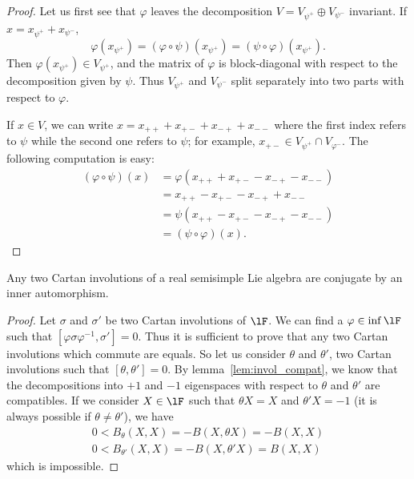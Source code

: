 \begin{proof}
	Let us first see that $\varphi$ leaves the decomposition $V=V_{\psi^+}\oplus V_{\psi^-}$ invariant. If $x=x_{\psi^+}+x_{\psi^-}$,
	\[
		\varphi(x_{\psi^+})=(\varphi\circ\psi)(x_{\psi^+})=(\psi\circ\varphi)(x_{\psi^+}).
	\]
	Then $\varphi(x_{\psi^+})\in V_{\psi^+}$, and the matrix of $\varphi$ is block-diagonal with respect to the decomposition given by $\psi$. Thus $V_{\psi^+}$ and $V_{\psi^-}$ split separately into two parts with respect to $\varphi$.

	If $x\in V$, we can write $x=x_{++}+x_{+-}+x_{-+}+x_{--}$ where the first index refers to $\psi$ while the second one refers to $\psi$; for example, $x_{+-}\in V_{\psi^+}\cap V_{\varphi^-}$. The following computation is easy:
	\begin{equation}
		\begin{split}
			(\varphi\circ\psi)(x)&=\varphi(x_{++}+x_{+-}-x_{-+}-x_{--})\\
			&=x_{++}-x_{+-}-x_{-+}+x_{--}\\
			&=\psi(x_{++}-x_{+-}-x_{-+}-x_{--})\\
			&=(\psi\circ\varphi)(x).
		\end{split}
	\end{equation}
\end{proof}

\begin{corollary}\label{cor:Cartan_conj_inner}
	Any two Cartan involutions of a real semisimple Lie algebra are conjugate by an inner automorphism. 
\end{corollary}

\begin{proof}
	Let $\sigma$ and $\sigma'$ be two Cartan involutions of $\lF$. We can find a $\varphi\in\inf\lF$ such that $[\varphi\sigma\varphi^{-1},\sigma']=0$. Thus it is sufficient to prove that any two Cartan involutions which commute are equals. So let us consider $\theta$ and $\theta'$, two Cartan involutions such that $[\theta,\theta']=0$. By lemma~\ref{lem:invol_compat}, we know that the decompositions into $+1$ and $-1$  eigenspaces with respect to $\theta$ and $\theta'$ are compatibles. If we consider $X\in\lF$ such that $\theta X=X$ and $\theta' X=-1$ (it is always possible if $\theta\neq\theta'$), we have
	\[
		\begin{split}
			0<B_{\theta}(X,X)=-B(X,\theta X)=-B(X,X)\\
			0<B_{\theta'}(X,X)=-B(X,\theta' X)=B(X,X)
		\end{split}
	\]
	which is impossible.
\end{proof}

